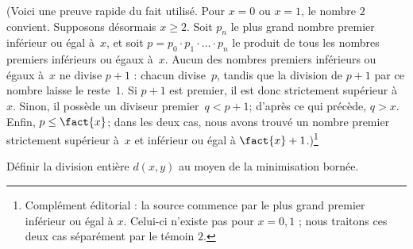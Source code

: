 \documentclass[../../../include/open-logic-section]{subfiles}
\begin{document}
(Voici une preuve rapide du fait utilisé. Pour $x=0$ ou
$x=1$, le nombre $2$ convient. Supposons désormais $x\geq2$.
Soit $p_n$ le plus grand nombre premier inférieur ou égal
à~$x$, et soit $p=p_0\cdot p_1\cdot\dots\cdot p_n$ le produit
de tous les nombres premiers inférieurs ou égaux à~$x$.
Aucun des nombres premiers inférieurs ou égaux à~$x$ ne divise
$p+1$ : chacun divise~$p$, tandis que la division de $p+1$ par ce
nombre laisse le reste~$1$.
Si $p+1$ est premier, il est donc strictement supérieur à~$x$.
Sinon, il possède un diviseur premier~$q<p+1$; d'après ce qui
précède, $q>x$. Enfin, $p\leq\fact{x}$; dans les deux cas, nous
avons trouvé un nombre premier strictement supérieur à~$x$
et inférieur ou égal à $\fact{x}+1$.)\footnote{Complément éditorial : la source commence par le plus grand premier inférieur ou égal à $x$. Celui-ci n'existe pas pour $x=0,1$ ; nous traitons ces deux cas séparément par le témoin $2$.}

\begin{prob}
Définir la division entière $d(x,y)$ au moyen de la
minimisation bornée.
\end{prob}
\end{document}
